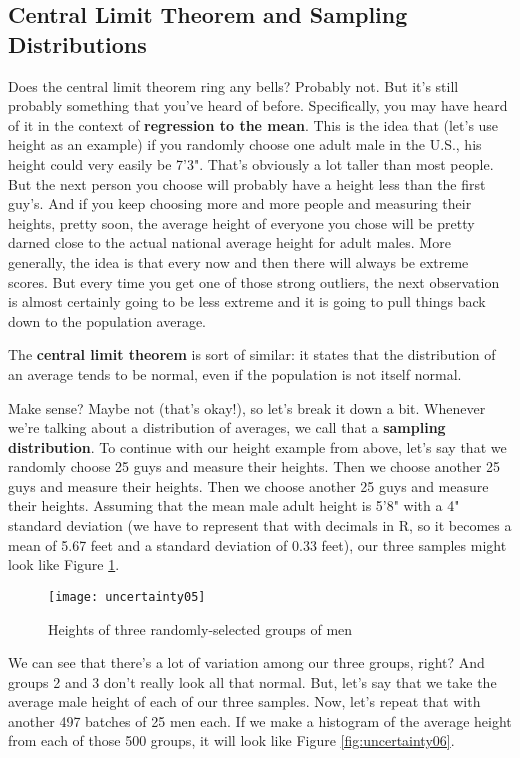 \subsection{Central Limit Theorem and Sampling Distributions}
Does the central limit theorem ring any bells? Probably not. But it's still probably something that you've heard of before. Specifically, you may have heard of it in the context of \textbf{regression to the mean}. This is the idea that (let's use height as an example) if you randomly choose one adult male in the U.S., his height could very easily be 7'3". That's obviously a lot taller than most people. But the next person you choose will probably have a height less than the first guy's. And if you keep choosing more and more people and measuring their heights, pretty soon, the average height of everyone you chose will be pretty darned close to the actual national average height for adult males. More generally, the idea is that every now and then there will always be extreme scores. But every time you get one of those strong outliers, the next observation is almost certainly going to be less extreme and it is going to pull things back down to the population average.

The \textbf{central limit theorem} is sort of similar: it states that the distribution of an average tends to be normal, even if the population is not itself normal.

Make sense? Maybe not (that's okay!), so let's break it down a bit. Whenever we're talking about a distribution of averages, we call that a \textbf{sampling distribution}. To continue with our height example from above, let's say that we randomly choose 25 guys and measure their heights. Then we choose another 25 guys and measure their heights. Then we choose another 25 guys and measure their heights. Assuming that the mean male adult height is 5'8" with a 4" standard deviation (we have to represent that with decimals in R, so it becomes a mean of 5.67 feet and a standard deviation of 0.33 feet), our three samples might look like Figure \ref{fig:uncertainty05}.

\begin{figure}[h!]
\texttt{[image: uncertainty05]}
\caption{Heights of three randomly-selected groups of men}
\label{fig:uncertainty05}
\end{figure}

We can see that there's a lot of variation among our three groups, right? And groups 2 and 3 don't really look all that normal. But, let's say that we take the average male height of each of our three samples. Now, let's repeat that with another 497 batches of 25 men each. If we make a histogram of the average height from each of those 500 groups, it will look like Figure \ref{fig:uncertainty06}.

